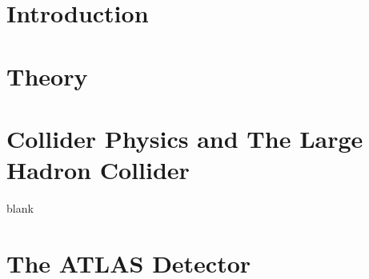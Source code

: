 \documentclass[11pt]{report}
\begin{document}
\listoftables

\newpage\listoffigures



\newpage
\endofprelim

\chapter{Introduction}
\label{sec:introduction}


\chapter{Theory}
\label{sec:theory}


\chapter{Collider Physics and The Large Hadron Collider}
\label{sec:lhc}
blank
%

\chapter{The ATLAS Detector}
\label{sec:atlas}







\end{document}

